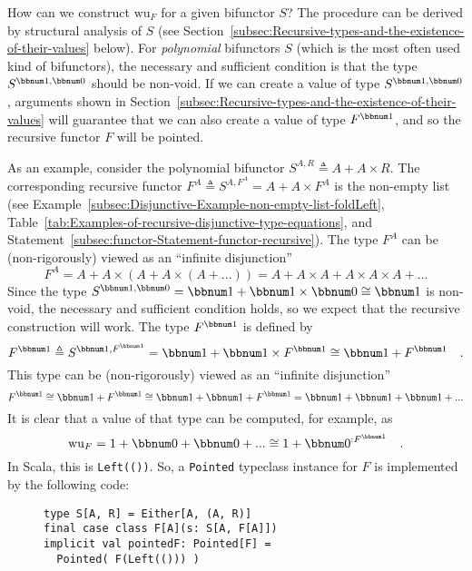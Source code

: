 How can we construct $\text{wu}_{F}$ for a given bifunctor $S$?
The procedure can be derived by structural analysis of $S$ (see Section~\ref{subsec:Recursive-types-and-the-existence-of-their-values}
below). For \emph{polynomial} bifunctors $S$ (which is the most often
used kind of bifunctors), the necessary and sufficient condition is
that the type $S^{\bbnum 1,\bbnum 0}$ should be non-void. If we can
create a value of type $S^{\bbnum 1,\bbnum 0}$ , arguments shown
in Section~\ref{subsec:Recursive-types-and-the-existence-of-their-values}
will guarantee that we can also create a value of type $F^{\bbnum 1}$,
and so the recursive functor $F$ will be pointed.

As an example, consider the polynomial bifunctor $S^{A,R}\triangleq A+A\times R$.
The corresponding recursive functor $F^{A}\triangleq S^{A,F^{A}}=A+A\times F^{A}$
is the non-empty list (see Example~\ref{subsec:Disjunctive-Example-non-empty-list-foldLeft},
Table~\ref{tab:Examples-of-recursive-disjunctive-type-equations},
and Statement~\ref{subsec:functor-Statement-functor-recursive}).
The type $F^{A}$ can be (non-rigorously) viewed as an \textsf{``}infinite
disjunction\textsf{''}
\[
F^{A}=A+A\times(A+A\times\left(A+...\right))=A+A\times A+A\times A\times A+...
\]
Since the type $S^{\bbnum 1,\bbnum 0}=\bbnum 1+\bbnum 1\times\bbnum 0\cong\bbnum 1$
is non-void, the necessary and sufficient condition holds, so we expect
that the recursive construction will work. The type $F^{\bbnum 1}$
is defined by 
\[
F^{\bbnum 1}\triangleq S^{\bbnum 1,F^{\bbnum 1}}=\bbnum 1+\bbnum 1\times F^{\bbnum 1}\cong\bbnum 1+F^{\bbnum 1}\quad.
\]
This type can be (non-rigorously) viewed as an \textsf{``}infinite disjunction\textsf{''}
\[
F^{\bbnum 1}\cong\bbnum 1+F^{\bbnum 1}\cong\bbnum 1+\bbnum 1+F^{\bbnum 1}=\bbnum 1+\bbnum 1+\bbnum 1+...
\]
It is clear that a value of that type can be computed, for example,
as 
\[
\text{wu}_{F}=1+\bbnum 0+\bbnum 0+...\cong1+\bbnum 0^{:F^{\bbnum 1}}\quad.
\]
In Scala, this is \lstinline!Left(())!. So, a \lstinline!Pointed!
typeclass instance for $F$ is implemented by the following code:

\begin{wrapfigure}{l}{0.42\columnwidth}%
\vspace{-0.8\baselineskip}
\begin{lstlisting}
type S[A, R] = Either[A, (A, R)]
final case class F[A](s: S[A, F[A]])
implicit val pointedF: Pointed[F] =
  Pointed( F(Left(())) )
\end{lstlisting}
\vspace{-0.5\baselineskip}
\end{wrapfigure}%

